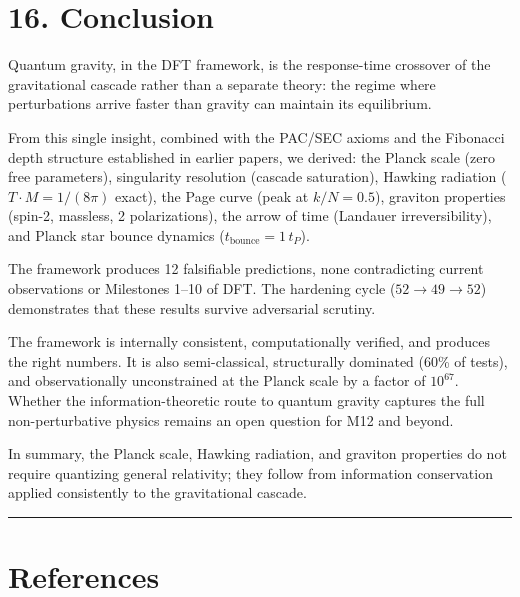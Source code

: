 \documentclass[11pt,a4paper]{article}
\begin{document}
\section*{16. Conclusion}

Quantum gravity, in the DFT framework, is the response-time crossover of the gravitational cascade rather than a separate theory: the regime where perturbations arrive faster than gravity can maintain its equilibrium.

From this single insight, combined with the PAC/SEC axioms and the Fibonacci depth structure established in earlier papers, we derived: the Planck scale (zero free parameters), singularity resolution (cascade saturation), Hawking radiation ($T \cdot M = 1/(8\pi)$ exact), the Page curve (peak at $k/N = 0.5$), graviton properties (spin-2, massless, 2 polarizations), the arrow of time (Landauer irreversibility), and Planck star bounce dynamics ($t_{\text{bounce}} = 1\,t_P$).

The framework produces 12 falsifiable predictions, none contradicting current observations or Milestones 1–10 of DFT. The hardening cycle ($52 \to 49 \to 52$) demonstrates that these results survive adversarial scrutiny.

The framework is internally consistent, computationally verified, and produces the right numbers. It is also semi-classical, structurally dominated (60\% of tests), and observationally unconstrained at the Planck scale by a factor of $10^{67}$. Whether the information-theoretic route to quantum gravity captures the full non-perturbative physics remains an open question for M12 and beyond.

In summary, the Planck scale, Hawking radiation, and graviton properties do not require quantizing general relativity; they follow from information conservation applied consistently to the gravitational cascade.

\begin{center}\rule{0.5\linewidth}{0.4pt}\end{center}

\section*{References}
\end{document}
